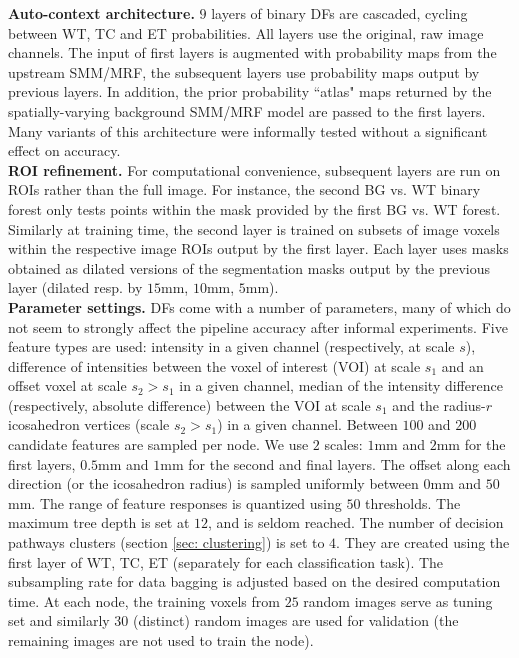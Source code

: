 \noindent
\textbf{Auto-context architecture.} $9$ layers of binary DFs are cascaded, cycling between WT, TC and ET probabilities. All layers use the original, raw image channels. The input of first layers is augmented with probability maps from the upstream SMM/MRF, the subsequent layers use probability maps output by previous layers. In addition, the prior probability ``atlas" maps returned by the spatially-varying background SMM/MRF model are passed to the first layers. Many variants of this architecture were informally tested without a significant effect on accuracy.\\

\noindent
\textbf{ROI refinement.} For computational convenience, subsequent layers are run on ROIs rather than the full image. For instance, the second BG vs. WT binary forest only tests points within the mask provided by the first BG vs. WT forest. Similarly at training time, the second layer is trained on subsets of image voxels within the respective image ROIs output by the first layer. Each layer uses masks obtained as dilated versions of the segmentation masks output by the previous layer (dilated resp. by $15$mm, $10$mm, $5$mm).\\

\noindent
\textbf{Parameter settings.} DFs come with a number of parameters, many of which do not seem to strongly affect the pipeline accuracy after informal experiments. Five feature types are used: intensity in a given channel (respectively, at scale $s$), difference of intensities between the voxel of interest (VOI) at scale $s_1$ and an offset voxel at scale $s_2\!>\! s_1$ in a given channel, median of the intensity difference (respectively, absolute difference) between the VOI at scale $s_1$ and the radius-$r$ icosahedron vertices (scale $s_2\! >\!s_1$) in a given channel. Between $100$ and $200$ candidate features are sampled per node. We use $2$ scales: $1$mm and $2$mm for the first layers, $0.5$mm and $1$mm for the second and final layers. The offset along each direction (or the icosahedron radius) is sampled uniformly between $0$mm and $50$mm. The range of feature responses is quantized using $50$ thresholds. The maximum tree depth is set at $12$, and is seldom reached. The number of decision pathways clusters (section \ref{sec: clustering}) is set to $4$. They are created using the first layer of WT, TC, ET (separately for each classification task). The subsampling rate for data bagging is adjusted based on the desired computation time. At each node, the training voxels from $25$ random images serve as tuning set and similarly $30$ (distinct) random images are used for validation (the remaining images are not used to train the node).

